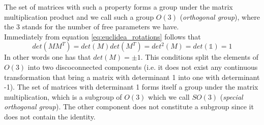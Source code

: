 \documentclass{article}
\begin{document}
The set of matrices with such a property forms a group under the matrix multiplication product and we call such a group $O(3)$ (\emph{orthogonal group}), where the 3 stands for the number of free parameters we have. \\
Immediately from equation \ref{eq:euclidea_rotations} follows that
\begin{equation*}
    det(MM^T) = det(M) det(M^T) = det^2(M) = det (\mathds{1}) = 1
\end{equation*}
In other words one has that $det(M) = \pm 1$. This conditions split the elements of $O(3)$ into two discoconnected components (i.e. it does not exist any continuous transformation that bring a matrix with determinant 1 into one with determinant -1). The set of matrices with determinant 1 forms itself a group under the matrix multiplication, which is a subgroup
of $O(3)$ which we call $SO(3)$ (\emph{special orthogonal group}). The other component does not constitute a subgroup since it does not contain the identity.
\end{document}
